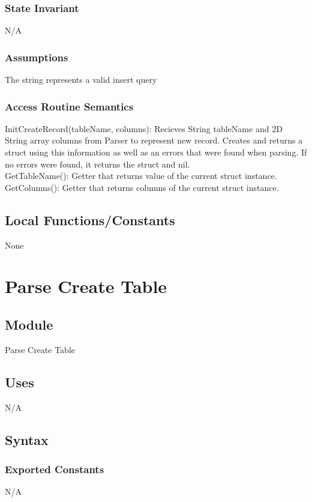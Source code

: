 \documentclass[12pt]{article}
\begin{document}
\subsubsection{State Invariant}
N/A

\subsubsection{Assumptions}
The string represents a valid insert query

\subsubsection{Access Routine Semantics}
InitCreateRecord(tableName, columns): Recieves String tableName and 2D String array columns from Parser to represent new record. Creates and returns a struct using this information as well as an errors that were found when parsing. If no errors were found, it returns the struct and nil.\\

\noindent GetTableName(): Getter that returns value of the current struct instance. \\

\noindent GetColumns(): Getter that returns columns of the current struct instance.

\subsection{Local Functions/Constants}
None

\newpage

\section{Parse Create Table}

\subsection{Module}
Parse Create Table

\subsection{Uses}
N/A

\subsection{Syntax}
\subsubsection{Exported Constants}
N/A
\end{document}
